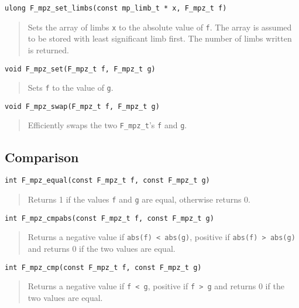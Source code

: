 \documentclass[a4paper,10pt]{article}
\newcommand{\code}{\lstinline}
\begin{document}
\begin{lstlisting}
ulong F_mpz_set_limbs(const mp_limb_t * x, F_mpz_t f)
\end{lstlisting}
\begin{quote}
Sets the array of limbs \code{x} to the absolute value of \code{f}. The array is assumed to be stored with least significant limb first. The number of limbs written is returned.
\end{quote}

\begin{lstlisting}
void F_mpz_set(F_mpz_t f, F_mpz_t g)
\end{lstlisting}
\begin{quote}
Sets \code{f} to the value of \code{g}.
\end{quote}

\begin{lstlisting}
void F_mpz_swap(F_mpz_t f, F_mpz_t g)
\end{lstlisting}
\begin{quote}
Efficiently swaps the two \code{F_mpz_t}'s \code{f} and \code{g}. 
\end{quote}

\subsection{Comparison}

\begin{lstlisting}
int F_mpz_equal(const F_mpz_t f, const F_mpz_t g)
\end{lstlisting}
\begin{quote}
Returns 1 if the values \code{f} and \code{g} are equal, otherwise returns 0.
\end{quote}

\begin{lstlisting}
int F_mpz_cmpabs(const F_mpz_t f, const F_mpz_t g)
\end{lstlisting}
\begin{quote}
Returns a negative value if \code{abs(f) < abs(g)}, positive if \code{abs(f) > abs(g)} and returns 0 if the two values are equal.
\end{quote}

\begin{lstlisting}
int F_mpz_cmp(const F_mpz_t f, const F_mpz_t g)
\end{lstlisting}
\begin{quote}
Returns a negative value if \code{f < g}, positive if \code{f > g} and returns 0 if the two values are equal.
\end{quote}
\end{document}
